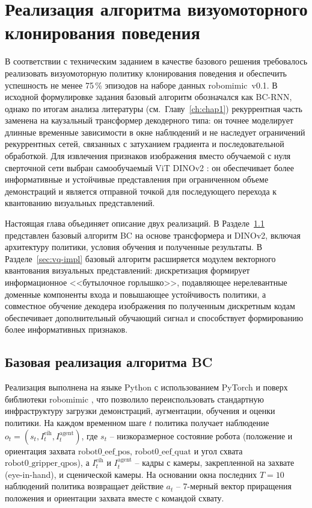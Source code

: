 \chapter{Реализация алгоритма визуомоторного клонирования поведения}
\label{ch:chap2}

В соответствии с техническим заданием в качестве базового решения требовалось реализовать визуомоторную политику клонирования поведения и обеспечить успешность не менее 75\,\% эпизодов на наборе данных robomimic~v0.1. В исходной формулировке задания базовый алгоритм обозначался как BC-RNN, однако по итогам анализа литературы (см.~Главу~\ref{ch:chap1}) рекуррентная часть заменена на каузальный трансформер декодерного типа: он точнее моделирует длинные временные зависимости в окне наблюдений и не наследует ограничений рекуррентных сетей, связанных с затуханием градиента и последовательной обработкой. Для извлечения признаков изображения вместо обучаемой с нуля сверточной сети выбран самообучаемый ViT DINOv2 \cite{oquab2024dinov2}: он обеспечивает более информативные и устойчивые представления при ограниченном объеме демонстраций и является отправной точкой для последующего перехода к квантованию визуальных представлений.

Настоящая глава объединяет описание двух реализаций. В Разделе~\ref{sec:bc-impl} представлен базовый алгоритм BC на основе трансформера и DINOv2, включая архитектуру политики, условия обучения и полученные результаты. В Разделе~\ref{sec:vq-impl} базовый алгоритм расширяется модулем векторного квантования визуальных представлений: дискретизация формирует информационное <<бутылочное горлышко>>, подавляющее нерелевантные доменные компоненты входа \cite{yang2023vector} и повышающее устойчивость политики, а совместное обучение декодера изображения по полученным дискретным кодам обеспечивает дополнительный обучающий сигнал и способствует формированию более информативных признаков.

\section{Базовая реализация алгоритма BC}
\label{sec:bc-impl}

Реализация выполнена на языке Python с использованием PyTorch и поверх библиотеки robomimic \cite{mandlekar2021robomimic}, что позволило переиспользовать стандартную инфраструктуру загрузки демонстраций, аугментации, обучения и оценки политики. На каждом временном шаге $t$ политика получает наблюдение $o_t = (s_t, I_t^{\text{eih}}, I_t^{\text{agent}})$, где $s_t$ -- низкоразмерное состояние робота (положение и ориентация захвата $\text{robot0\_eef\_pos}$, $\text{robot0\_eef\_quat}$ и угол схвата $\text{robot0\_gripper\_qpos}$), а $I_t^{\text{eih}}$ и $I_t^{\text{agent}}$ -- кадры с камеры, закрепленной на захвате (eye-in-hand), и сценической камеры. На основании окна последних $T = 10$ наблюдений политика возвращает действие $a_t$ -- 7-мерный вектор приращения положения и ориентации захвата вместе с командой схвату.

